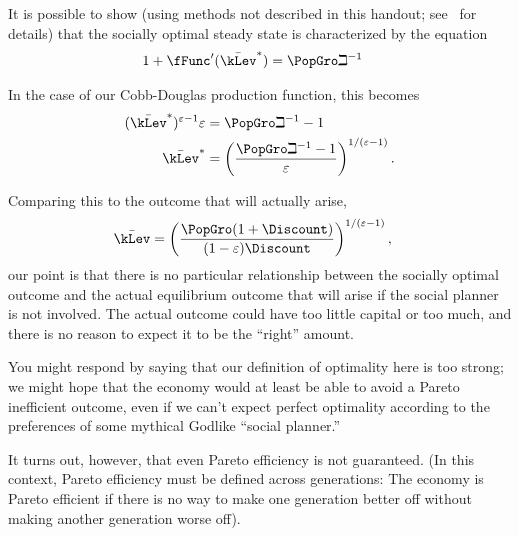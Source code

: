 \documentclass{handout}
\begin{document}
It is possible to show (using methods not described in this handout; see~\cite{blanchard&fischer:text} for details) that the socially optimal steady state is 
characterized by the equation
\begin{equation}\begin{gathered}\begin{aligned}
  1+\fFunc^{\prime}(\bar{\kLev}^{*}) & =  \PopGro \beth^{-1}
\end{aligned}\end{gathered}\end{equation}

In the case of our Cobb-Douglas production function, this 
becomes
\begin{equation}\begin{gathered}\begin{aligned}
  \label{eq:2}
  (\bar{\kLev}^{*})^{\varepsilon-1}\varepsilon  & =  \PopGro \beth^{-1} - 1
\\ \bar{\kLev}^{*} & =  \left(\frac{\PopGro \beth^{-1} - 1}{\varepsilon}\right)^{1/(\varepsilon-1)}
.
\end{aligned}\end{gathered}\end{equation}

Comparing this to the outcome that will actually arise, 
\begin{equation}\begin{gathered}\begin{aligned}
\bar{\kLev} & =  \left(\frac{\PopGro(1+\Discount)}{(1-\varepsilon) \Discount}\right)^{1/(\varepsilon-1)},  
\end{aligned}\end{gathered}\end{equation}
our point is that there is no particular relationship between
the socially optimal outcome and the actual equilibrium outcome
that will arise if the social planner is not involved.  The actual
outcome could have too little capital or too much, and there is no 
reason to expect it to be the ``right'' amount.

You might respond by saying that our definition of optimality here
is too strong; we might hope that the economy would at least be able
to avoid a Pareto inefficient outcome, even if we can't expect 
perfect optimality according to the preferences of some mythical Godlike 
``social planner.''

It turns out, however, that even Pareto efficiency is not guaranteed.
(In this context, Pareto efficiency must be defined across generations:
The economy is Pareto efficient if there is no way to make one generation
better off without making another generation worse off).
\end{document}
